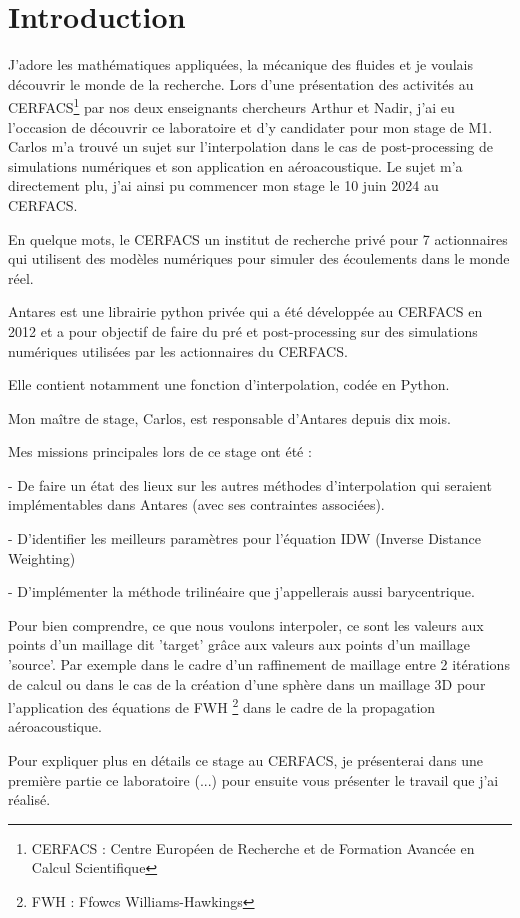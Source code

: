 \section*{Introduction}

J'adore les mathématiques appliquées, la mécanique des fluides et je voulais découvrir le monde de la recherche. Lors d'une présentation des activités au
CERFACS\footnote{CERFACS : Centre Européen de Recherche et de Formation Avancée en Calcul Scientifique} par nos deux enseignants chercheurs Arthur et Nadir, j'ai eu l'occasion de découvrir ce laboratoire et d'y candidater pour mon stage de M1. Carlos m'a trouvé un sujet sur l'interpolation dans le cas de post-processing de simulations numériques et son application en aéroacoustique. Le sujet m'a directement plu, j'ai ainsi pu commencer mon stage le 10 juin 2024 au CERFACS.

En quelque mots, le CERFACS un institut de recherche privé pour 7 actionnaires qui utilisent des modèles numériques pour simuler des écoulements dans le monde réel.

Antares est une librairie python privée qui a été développée au CERFACS en 2012 et a pour objectif de faire du pré et post-processing sur des simulations numériques utilisées par les actionnaires du CERFACS.

Elle contient notamment une fonction d'interpolation, codée en Python.

Mon maître de stage, Carlos, est responsable d'Antares depuis dix mois. 

Mes missions principales lors de ce stage ont été :

- De faire un état des lieux sur les autres méthodes d'interpolation qui seraient 
implémentables dans Antares (avec ses contraintes associées).

- D'identifier les meilleurs paramètres pour l'équation IDW (Inverse Distance Weighting)

- D'implémenter la méthode trilinéaire que j'appellerais aussi barycentrique.

Pour bien comprendre, ce que nous voulons interpoler, ce sont les valeurs aux points d'un maillage dit 'target' grâce aux valeurs aux points d'un maillage 'source'. Par exemple dans le cadre d'un raffinement de maillage entre 2 itérations de calcul ou dans le cas de la création d'une sphère dans un maillage 3D pour l'application des équations de FWH \footnote{FWH : Ffowcs Williams-Hawkings} dans le cadre de la propagation aéroacoustique.

Pour expliquer plus en détails ce stage au CERFACS, je présenterai dans une première partie ce laboratoire (...) pour ensuite vous présenter le travail que j'ai réalisé.

% 